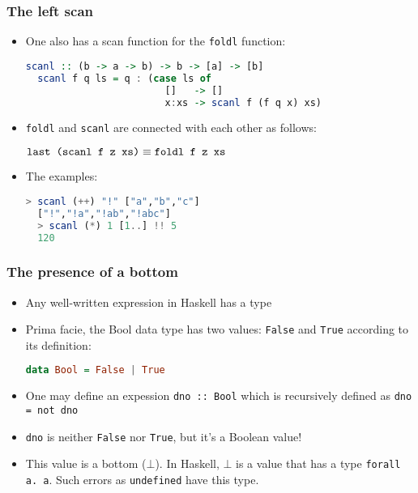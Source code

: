 \documentclass[10pt,pdf,utf8,russian,aspectratio=169]{beamer}
\begin{document}
\begin{frame}[fragile]
  \frametitle{The left scan}
  \begin{itemize}
  \item One also has a scan function for the \verb"foldl" function:
  \begin{lstlisting}[language=Haskell]
  scanl :: (b -> a -> b) -> b -> [a] -> [b]
  scanl f q ls = q : (case ls of
                        []   -> []
                        x:xs -> scanl f (f q x) xs)
  \end{lstlisting}
  \item \verb"foldl" and \verb"scanl" are connected with each other as follows:
  \begin{center}
   $\verb"last (scanl f z xs)" \equiv \verb"foldl f z xs"$
  \end{center}
  \item The examples:
  \begin{lstlisting}[language=Haskell]
  > scanl (++) "!" ["a","b","c"]
  ["!","!a","!ab","!abc"]
  > scanl (*) 1 [1..] !! 5
  120
  \end{lstlisting}
  \end{itemize}
\end{frame}

\begin{frame}[fragile]
  \frametitle{The presence of a bottom}

  \begin{itemize}
    \item Any well-written expression in Haskell has a type
    \item Prima facie, the Bool data type has two values: \verb"False" and \verb"True" according to its definition:
    \begin{lstlisting}[language=Haskell]
    data Bool = False | True
    \end{lstlisting}
    \item One may define an expession \verb"dno :: Bool" which is recursively defined as \verb"dno = not dno"
    \item \verb"dno" is neither \verb"False" nor \verb"True", but it's a Boolean value!
    \item This value is a bottom ($\bot$). In Haskell, $\bot$ is a value that has a type \verb"forall a. a". Such errors as \verb"undefined" have this type.
  \end{itemize}
\end{frame}
\end{document}
